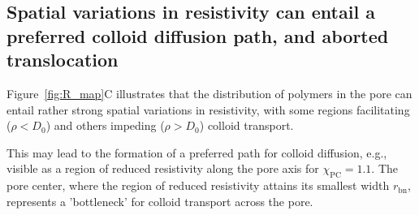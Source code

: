 \documentclass[12pt, a4paper]{article}
\begin{document}





\subsection{Spatial variations in resistivity can entail a preferred colloid diffusion path, and aborted translocation}

Figure~\ref{fig:R_map}C illustrates that the distribution of polymers in the pore can entail rather strong spatial variations in resistivity, with some regions facilitating ($\rho < D_0$) and others impeding ($\rho > D_0$) colloid transport.

This may lead to the formation of a preferred path for colloid diffusion, e.g., visible as a region of reduced resistivity along the pore axis for $\chi_{\text{PC}} = 1.1$.
The pore center, where the region of reduced resistivity attains its smallest width $r_{\text{bn}}$, represents a 'bottleneck' for colloid transport across the pore.

\end{document}
